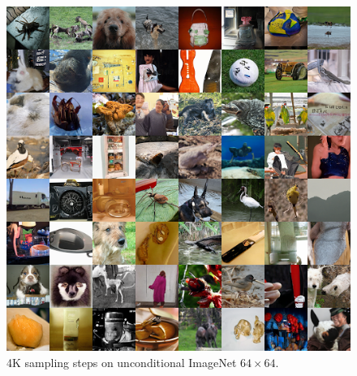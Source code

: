 \documentclass{article}
\begin{document}
\begin{figure}[h!]
    \centerline{\includegraphics[width=0.78\columnwidth]{samples_hybrid_1.5M_grid.png}}
    \caption{\label{fig:lastimagenet} 4K sampling steps on unconditional ImageNet $64 \times 64$.}
    \vskip -0.4in
\end{figure}

\clearpage
\end{document}
